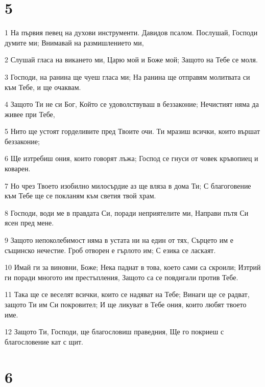 \chapter{5}

\par 1 На първия певец на духови инструменти. Давидов псалом. Послушай, Господи думите ми; Внимавай на размишлението ми,
\par 2 Слушай гласа на викането ми, Царю мой и Боже мой; Защото на Тебе се моля.
\par 3 Господи, на ранина ще чуеш гласа ми; На ранина ще отправям молитвата си към Тебе, и ще очаквам.
\par 4 Защото Ти не си Бог, Който се удоволствуваш в беззаконие; Нечистият няма да живее при Тебе,
\par 5 Нито ще устоят горделивите пред Твоите очи. Ти мразиш всички, които вършат беззаконие;
\par 6 Ще изтребиш ония, които говорят лъжа; Господ се гнуси от човек кръвопиец и коварен.
\par 7 Но чрез Твоето изобилно милосърдие аз ще вляза в дома Ти; С благоговение към Тебе ще се покланям към светия твой храм.
\par 8 Господи, води ме в правдата Си, поради неприятелите ми, Направи пътя Си ясен пред мене.
\par 9 Защото непоколебимост няма в устата ни на един от тях, Сърцето им е същинско нечестие. Гроб отворен е гърлото им; С езика се ласкаят.
\par 10 Имай ги за виновни, Боже; Нека паднат в това, което сами са скроили; Изтрий ги поради многото им престъпления, Защото са се повдигали против Тебе.
\par 11 Така ще се веселят всички, които се надяват на Тебе; Винаги ще се радват, защото Ти им Си покровител; И ще ликуват в Тебе ония, които любят твоето име.
\par 12 Защото Ти, Господи, ще благословиш праведния, Ще го покриеш с благословение кат с щит.

\chapter{6}


